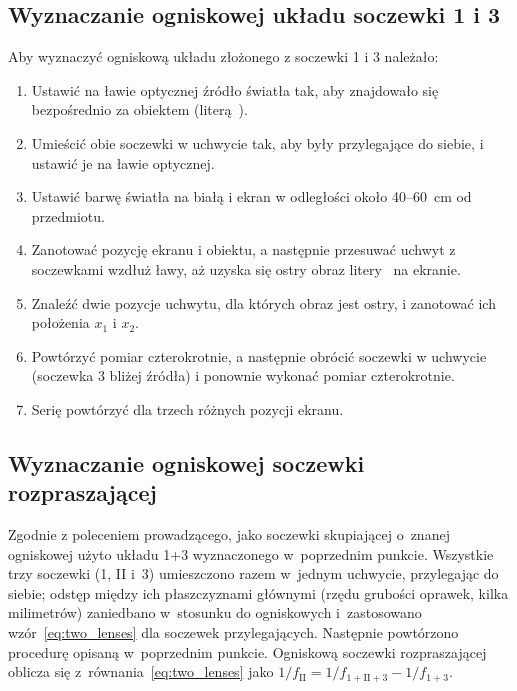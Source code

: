 \documentclass[12pt, a4paper]{article}
\begin{document}
\subsection{Wyznaczanie ogniskowej układu soczewki 1 i 3}
Aby wyznaczyć ogniskową układu złożonego z soczewki 1 i 3 należało:
\begin{enumerate}
    \item Ustawić na ławie optycznej źródło światła tak, aby znajdowało się bezpośrednio za obiektem (literą~).
    \item Umieścić obie soczewki w uchwycie tak, aby były przylegające do siebie, i ustawić je na ławie optycznej.
    \item Ustawić barwę światła na białą i ekran w odległości około 40--60~cm od przedmiotu.
    \item Zanotować pozycję ekranu i obiektu, a następnie przesuwać uchwyt z soczewkami wzdłuż ławy, aż uzyska się ostry obraz litery~ na ekranie.
    \item Znaleźć dwie pozycje uchwytu, dla których obraz jest ostry, i zanotować ich położenia $x_1$ i $x_2$.
    \item Powtórzyć pomiar czterokrotnie, a następnie obrócić soczewki w uchwycie (soczewka 3 bliżej źródła) i ponownie wykonać pomiar czterokrotnie.
    \item Serię powtórzyć dla trzech różnych pozycji ekranu.
\end{enumerate}

\subsection{Wyznaczanie ogniskowej soczewki rozpraszającej}
Zgodnie z poleceniem prowadzącego, jako soczewki skupiającej o~znanej ogniskowej
użyto układu 1+3 wyznaczonego w~poprzednim punkcie.
Wszystkie trzy soczewki (1, II i~3) umieszczono razem w~jednym uchwycie,
przylegając do siebie; odstęp między ich płaszczyznami głównymi
(rzędu grubości oprawek, kilka milimetrów) zaniedbano w~stosunku do ogniskowych
i~zastosowano wzór~\eqref{eq:two_lenses} dla soczewek przylegających.
Następnie powtórzono procedurę opisaną w~poprzednim punkcie.
Ogniskową soczewki rozpraszającej oblicza się z~równania~\eqref{eq:two_lenses}
jako $1/f_{\mathrm{II}} = 1/f_{1+\mathrm{II}+3} - 1/f_{1+3}$.
\end{document}
